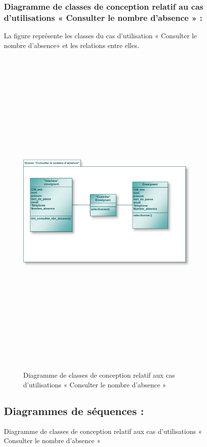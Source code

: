 \documentclass[12 pt]{report}
\begin{document}
\begin{figure}[h]
\begin{center}
\subsubsection{Diagramme de classes de conception relatif au cas d'utilisations       « Consulter le nombre d'absence » :}
La figure  représente les classes du cas d’utilisation « Consulter le nombre d'absence» et les relations entre elles.
\begin{figure}[h]
 \begin{center}
\includegraphics[width= 18 cm ,height=  17cm]{cl_cna.PNG}
\caption{Diagramme de classes de conception relatif aux cas d'utilisations « Consulter le nombre d'absence » }

\end{center}
\end{figure}
\newpage
\subsection{Diagrammes de séquences :}


\end{center}
\end{figure}
\end{document}
